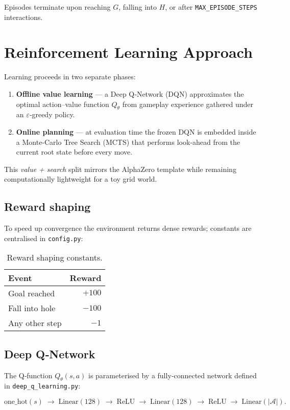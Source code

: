 \documentclass{report}
\begin{document}
Episodes terminate upon reaching $G$, falling into $H$, or after \texttt{MAX\_EPISODE\_STEPS} interactions.
 
\section{Reinforcement Learning Approach}
Learning proceeds in two separate phases:
\begin{enumerate}
  \item \textbf{Offline value learning} — a Deep Q‑Network (DQN) approximates the optimal action–value function $Q_{\theta}$ from gameplay experience gathered under an $\varepsilon$‑greedy policy.
  \item \textbf{Online planning} — at evaluation time the frozen DQN is embedded inside a Monte‑Carlo Tree Search (MCTS) that performs look‑ahead from the current root state before every move.
\end{enumerate}
 
This \emph{value + search} split mirrors the AlphaZero template while remaining computationally lightweight for a toy grid world.
 
\subsection{Reward shaping}
To speed up convergence the environment returns dense rewards; constants are centralised in \texttt{config.py}:
 
\begin{table}[h!]
  \centering
  \begin{tabular}{l r}
    \toprule
    Event & Reward \\
    \midrule
    Goal reached & $+100$ \\
    Fall into hole & $-100$ \\
    Any other step & $-1$ \\
    \bottomrule
  \end{tabular}
  \caption{Reward shaping constants.}
  \label{tab:rewards}
\end{table}
 
\subsection{Deep Q‑Network}
The Q‑function $Q_{\theta}(s,a)$ is parameterised by a fully‑connected network defined in \texttt{deep\_q\_learning.py}:
 
\[
\text{one\_hot}(s) \;\rightarrow\; \text{Linear}(128) \;\rightarrow\; \text{ReLU} \;\rightarrow\; \text{Linear}(128) \;\rightarrow\; \text{ReLU} \;\rightarrow\; \text{Linear}(|\mathcal{A}|).
\]
 
\end{document}
